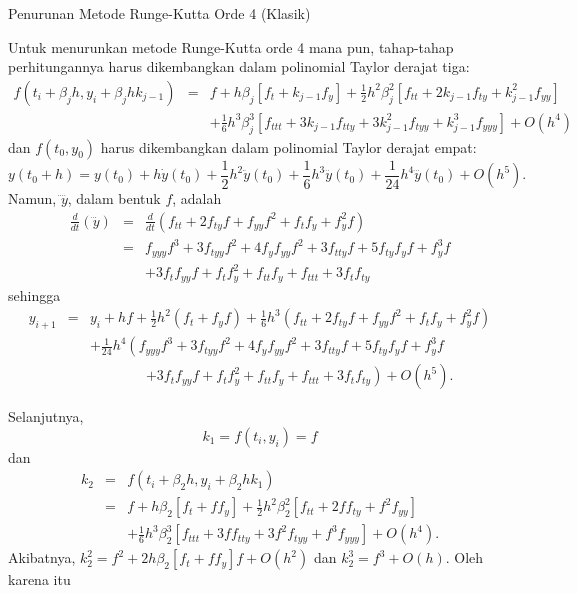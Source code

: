 \noindent\begin{digression}{Penurunan Metode Runge-Kutta Orde 4 (Klasik)}

\noindent Untuk menurunkan metode Runge-Kutta orde 4 mana pun, tahap-tahap
perhitungannya harus dikembangkan dalam polinomial Taylor derajat
tiga: 
\begin{eqnarray*}
f(t_{i}+\beta_{j}h,y_{i}+\beta_{j}hk_{j-1}) & = & f+h\beta_{j}\left[f_{t}+k_{j-1}f_{y}\right]+\frac{1}{2}h^{2}\beta_{j}^{2}\left[f_{tt}+2k_{j-1}f_{ty}+k_{j-1}^{2}f_{yy}\right]\\
 &  & +\frac{1}{6}h^{3}\beta_{j}^{3}\left[f_{ttt}+3k_{j-1}f_{tty}+3k_{j-1}^{2}f_{tyy}+k_{j-1}^{3}f_{yyy}\right]+O(h^{4})
\end{eqnarray*}
dan $f(t_{0},y_{0})$ harus dikembangkan dalam polinomial Taylor derajat
empat:
\[
y(t_{0}+h)=y(t_{0})+h\dot{y}(t_{0})+\frac{1}{2}h^{2}\ddot{y}(t_{0})+\frac{1}{6}h^{3}\dddot{y}(t_{0})+\frac{1}{24}h^{4}\ddddot{y}(t_{0})+O(h^{5}).
\]
Namun, $\ddddot{y}$, dalam bentuk $f$, adalah
\begin{eqnarray*}
\frac{d}{dt}(\dddot{y}) & = & \frac{d}{dt}\left(f_{tt}+2f_{ty}f+f_{yy}f^{2}+f_{t}f_{y}+f_{y}^{2}f\right)\\
 & = & f_{yyy}f^{3}+3f_{tyy}f^{2}+4f_{y}f_{yy}f^{2}+3f_{tty}f+5f_{ty}f_{y}f+f_{y}^{3}f\\
 &  & +3f_{t}f_{yy}f+f_{t}f_{y}^{2}+f_{tt}f_{y}+f_{ttt}+3f_{t}f_{ty}
\end{eqnarray*}
sehingga
\begin{eqnarray*}
y_{i+1} & = & y_{i}+hf+\frac{1}{2}h^{2}(f_{t}+f_{y}f)+\frac{1}{6}h^{3}(f_{tt}+2f_{ty}f+f_{yy}f^{2}+f_{t}f_{y}+f_{y}^{2}f)\\
 &  & +\frac{1}{24}h^{4}\left(f_{yyy}f^{3}+3f_{tyy}f^{2}+4f_{y}f_{yy}f^{2}+3f_{tty}f+5f_{ty}f_{y}f+f_{y}^{3}f\right.\\
 &  & \qquad\qquad\left.+3f_{t}f_{yy}f+f_{t}f_{y}^{2}+f_{tt}f_{y}+f_{ttt}+3f_{t}f_{ty}\right)+O(h^{5}).
\end{eqnarray*}

Selanjutnya,
\[
k_{1}=f(t_{i},y_{i})=f
\]
dan
\begin{eqnarray*}
k_{2} & = & f\left(t_{i}+\beta_{2}h,y_{i}+\beta_{2}hk_{1}\right)\\
 & = & f+h\beta_{2}\left[f_{t}+ff_{y}\right]+\frac{1}{2}h^{2}\beta_{2}^{2}\left[f_{tt}+2ff_{ty}+f^{2}f_{yy}\right]\\
 &  & +\frac{1}{6}h^{3}\beta_{2}^{3}\left[f_{ttt}+3ff_{tty}+3f^{2}f_{tyy}+f^{3}f_{yyy}\right]+O(h^{4}).
\end{eqnarray*}
Akibatnya, $k_{2}^{2}=f^{2}+2h\beta_{2}\left[f_{t}+ff_{y}\right]f+O(h^{2})$
dan $k_{2}^{3}=f^{3}+O(h)$. Oleh karena itu


\end{digression}
